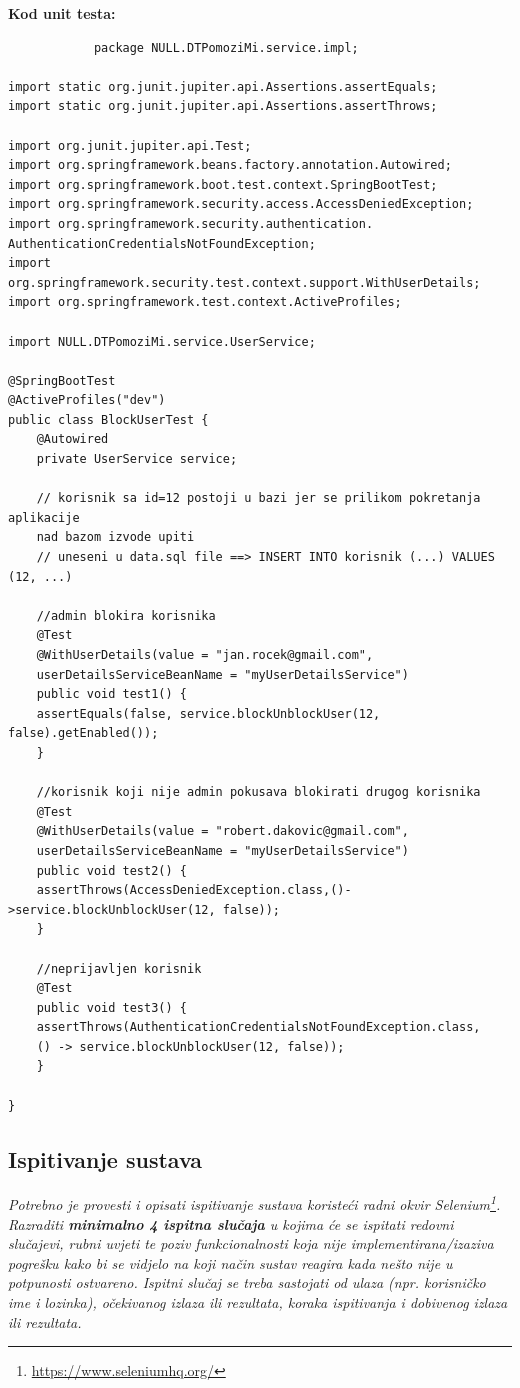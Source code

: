             \noindent \textbf{Kod unit testa: }
            \begin{verbatim}
            package NULL.DTPomoziMi.service.impl;

import static org.junit.jupiter.api.Assertions.assertEquals;
import static org.junit.jupiter.api.Assertions.assertThrows;

import org.junit.jupiter.api.Test;
import org.springframework.beans.factory.annotation.Autowired;
import org.springframework.boot.test.context.SpringBootTest;
import org.springframework.security.access.AccessDeniedException;
import org.springframework.security.authentication.
AuthenticationCredentialsNotFoundException;
import org.springframework.security.test.context.support.WithUserDetails;
import org.springframework.test.context.ActiveProfiles;

import NULL.DTPomoziMi.service.UserService;

@SpringBootTest
@ActiveProfiles("dev")
public class BlockUserTest {
	@Autowired
	private UserService service;

	// korisnik sa id=12 postoji u bazi jer se prilikom pokretanja aplikacije
	nad bazom izvode upiti 
	// uneseni u data.sql file ==> INSERT INTO korisnik (...) VALUES (12, ...)

	//admin blokira korisnika
	@Test
	@WithUserDetails(value = "jan.rocek@gmail.com",
	userDetailsServiceBeanName = "myUserDetailsService")
	public void test1() { 
	assertEquals(false,	service.blockUnblockUser(12, false).getEnabled());
	}

	//korisnik koji nije admin pokusava blokirati drugog korisnika
	@Test
	@WithUserDetails(value = "robert.dakovic@gmail.com",
	userDetailsServiceBeanName = "myUserDetailsService")
	public void test2() {
	assertThrows(AccessDeniedException.class,()->service.blockUnblockUser(12, false));
	}

	//neprijavljen korisnik
	@Test
	public void test3() {
	assertThrows(AuthenticationCredentialsNotFoundException.class, 
	() -> service.blockUnblockUser(12, false)); 
	}

}
            \end{verbatim}
            
			\subsection{Ispitivanje sustava}
			
			 \textit{Potrebno je provesti i opisati ispitivanje sustava koristeći radni okvir Selenium\footnote{\url{https://www.seleniumhq.org/}}. Razraditi \textbf{minimalno 4 ispitna slučaja} u kojima će se ispitati redovni slučajevi, rubni uvjeti te poziv funkcionalnosti koja nije implementirana/izaziva pogrešku kako bi se vidjelo na koji način sustav reagira kada nešto nije u potpunosti ostvareno. Ispitni slučaj se treba sastojati od ulaza (npr. korisničko ime i lozinka), očekivanog izlaza ili rezultata, koraka ispitivanja i dobivenog izlaza ili rezultata.\\ }
			 
